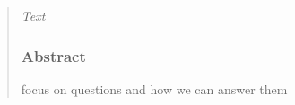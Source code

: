 \begin{quote}

\textsl{Text }\\
\subsubsection{Abstract}
focus on questions and how we can answer them\\


\FloatBarrier


\end{quote}